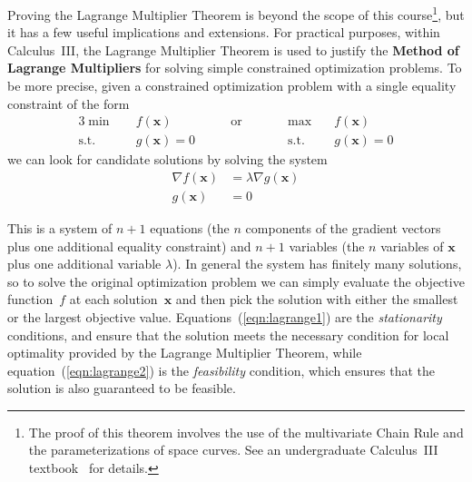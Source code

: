 \documentclass[11pt]{article}
\theoremstyle{definition} %
\begin{document}
Proving the Lagrange Multiplier Theorem is beyond the scope of this course\footnote{The proof of this theorem involves the use of the multivariate Chain Rule and the parameterizations of space curves. See an undergraduate Calculus~III textbook~\cite{stewart,openstax3} for details.}, but it has a few useful implications and extensions. For practical purposes, within Calculus~III, the Lagrange Multiplier Theorem is used to justify the \textbf{Method of Lagrange Multipliers} for solving simple constrained optimization problems. To be more precise, given a constrained optimization problem with a single equality constraint of the form
\begin{alignat*}{3}
	\min \quad& f(\mathbf{x}) &\qquad \text{or} \qquad&& \max \quad& f(\mathbf{x}) \\
	\mathrm{s.t.} \quad& g(\mathbf{x}) = 0 &&& \mathrm{s.t.} \quad& g(\mathbf{x}) = 0
\end{alignat*}
we can look for candidate solutions by solving the system
\begin{align}
	\label{eqn:lagrange1} \nabla f(\mathbf{x}) &= \lambda \nabla g(\mathbf{x}) \\
	\label{eqn:lagrange2} g(\mathbf{x}) &= 0
\end{align}

This is a system of $n+1$ equations (the $n$ components of the gradient vectors plus one additional equality constraint) and $n+1$ variables (the $n$ variables of $\mathbf{x}$ plus one additional variable $\lambda$). In general the system has finitely many solutions, so to solve the original optimization problem we can simply evaluate the objective function~$f$ at each solution~$\mathbf{x}$ and then pick the solution with either the smallest or the largest objective value. Equations~(\ref{eqn:lagrange1}) are the \textit{stationarity} conditions, and ensure that the solution meets the necessary condition for local optimality provided by the Lagrange Multiplier Theorem, while equation~(\ref{eqn:lagrange2}) is the \textit{feasibility} condition, which ensures that the solution is also guaranteed to be feasible.
\end{document}
